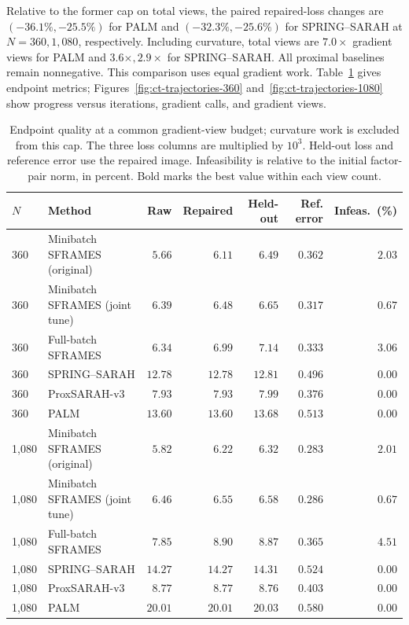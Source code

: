 Relative to the former cap on total views, the paired repaired-loss changes are \((-36.1\%,-25.5\%)\) for PALM and \((-32.3\%,-25.6\%)\) for SPRING--SARAH at \(N=360,1{,}080\), respectively. Including curvature, total views are \(7.0\times\) gradient views for PALM and \(3.6\times,2.9\times\) for SPRING--SARAH. All proximal baselines remain nonnegative. This comparison uses equal gradient work.
Table~\ref{tab:ct-results} gives endpoint metrics; Figures~\ref{fig:ct-trajectories-360}
and~\ref{fig:ct-trajectories-1080} show progress versus iterations, gradient calls,
and gradient views.

\begin{table}[!htbp]
\centering
\caption{Endpoint quality at a common gradient-view budget; curvature work is excluded from this cap. The three loss columns are multiplied by \(10^3\). Held-out loss and reference error use the repaired image. Infeasibility is relative to the initial factor-pair norm, in percent. Bold marks the best value within each view count.}
\label{tab:ct-results}
\small
\setlength{\tabcolsep}{4pt}
\begin{tabular}{@{}llrrrrr@{}}
\toprule
$N$ & Method & Raw & Repaired & Held-out & Ref. error & Infeas.\ (\%) \\
\midrule
360 & Minibatch SFRAMES (original) & $\boldsymbol{5.66}$ & $\boldsymbol{6.11}$ & $\boldsymbol{6.49}$ & $0.362$ & $2.03$ \\
360 & Minibatch SFRAMES (joint tune) & $6.39$ & $6.48$ & $6.65$ & $\boldsymbol{0.317}$ & $0.67$ \\
360 & Full-batch SFRAMES & $6.34$ & $6.99$ & $7.14$ & $0.333$ & $3.06$ \\
360 & SPRING--SARAH & $12.78$ & $12.78$ & $12.81$ & $0.496$ & $\boldsymbol{0.00}$ \\
360 & ProxSARAH-v3 & $7.93$ & $7.93$ & $7.99$ & $0.376$ & $\boldsymbol{0.00}$ \\
360 & PALM & $13.60$ & $13.60$ & $13.68$ & $0.513$ & $\boldsymbol{0.00}$ \\
1{,}080 & Minibatch SFRAMES (original) & $\boldsymbol{5.82}$ & $\boldsymbol{6.22}$ & $\boldsymbol{6.32}$ & $\boldsymbol{0.283}$ & $2.01$ \\
1{,}080 & Minibatch SFRAMES (joint tune) & $6.46$ & $6.55$ & $6.58$ & $0.286$ & $0.67$ \\
1{,}080 & Full-batch SFRAMES & $7.85$ & $8.90$ & $8.87$ & $0.365$ & $4.51$ \\
1{,}080 & SPRING--SARAH & $14.27$ & $14.27$ & $14.31$ & $0.524$ & $\boldsymbol{0.00}$ \\
1{,}080 & ProxSARAH-v3 & $8.77$ & $8.77$ & $8.76$ & $0.403$ & $\boldsymbol{0.00}$ \\
1{,}080 & PALM & $20.01$ & $20.01$ & $20.03$ & $0.580$ & $\boldsymbol{0.00}$ \\
\bottomrule
\end{tabular}
\end{table}

